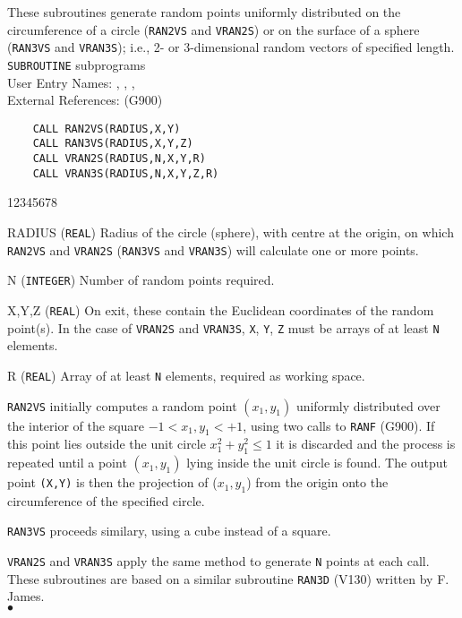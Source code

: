                           
                           
\Submitter{ }                              
                         
These subroutines generate random points uniformly distributed on
the circumference of a circle ({\tt RAN2VS} and {\tt VRAN2S})
or on the surface of a sphere ({\tt RAN3VS} and {\tt VRAN3S});
i.e., 2- or 3-dimensional random vectors of specified length.
\Structure
{\tt SUBROUTINE} subprograms \\
User Entry Names: , , ,
\\
External References:  (G900)
\Usage
\begin{verbatim}
    CALL RAN2VS(RADIUS,X,Y)
    CALL RAN3VS(RADIUS,X,Y,Z)
    CALL VRAN2S(RADIUS,N,X,Y,R)
    CALL VRAN3S(RADIUS,N,X,Y,Z,R)
\end{verbatim}
\begin{DLtt}{12345678}
\item [RADIUS] ({\tt REAL}) Radius of the circle (sphere), with
centre at the origin, on which {\tt RAN2VS} and {\tt VRAN2S}
({\tt RAN3VS} and {\tt VRAN3S}) will calculate one or more points.
\item [N] ({\tt INTEGER}) Number of random points required.
\item [X,Y,Z] ({\tt REAL}) On exit, these contain the Euclidean
coordinates of the random point(s). In the case of {\tt VRAN2S} and
{\tt VRAN3S}, {\tt X}, {\tt Y}, {\tt Z} must be arrays of at least
{\tt N} elements.
\item [R]({\tt REAL}) Array of at least {\tt N} elements, required
as working space.
\end{DLtt}
\Method
{\tt RAN2VS} initially computes a random point $(x_1,y_1)$ uniformly
distributed over the interior of the square $-1 < x_1,y_1 < +1$,
using two calls to {\tt RANF} (G900). If this point lies outside the unit
circle $x_1^2 + y_1^2 \leq 1$ it is discarded and the process
is repeated until a point $(x_1,y_1)$ lying inside the unit circle
is found. The output point {\tt (X,Y)} is then the projection of
($x_1,y_1$) from the origin onto the circumference of the
specified circle.
\par
{\tt RAN3VS} proceeds similary, using a cube instead of a square.
\par
{\tt VRAN2S} and {\tt VRAN3S} apply the same method to generate
{\tt N} points at each call.
\Source
These subroutines are based on a similar subroutine {\tt RAN3D} (V130)
written by F. James.
\\ $\bullet$
